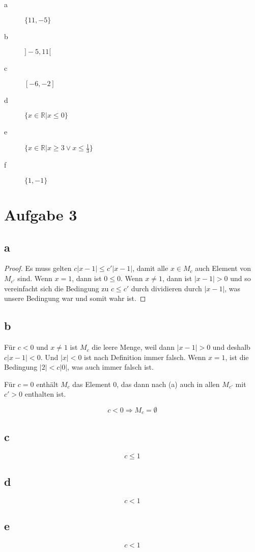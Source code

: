\documentclass[a4paper,10pt]{article}
\begin{document}
\begin{description}
 \item[a] $\{11, -5\}$
 \item[b] $]-5, 11[$
 \item[c] $[-6, -2]$
 \item[d] $\{ x \in \mathbb{R} | x \le 0\}$
 \item[e] $\{ x \in \mathbb{R} | x \ge 3 \lor x \le \frac{1}{3}\}$
 \item[f] $\{1, -1\}$
\end{description}

\section*{Aufgabe 3}

\subsection*{a}

\begin{proof}
 Es muss gelten $c|x - 1| \le c'|x - 1|$, damit alle $x \in M_c$ auch Element von $M_{c'}$ sind.
 Wenn $x = 1$, dann ist $0 \le 0$.
 Wenn $x \ne 1$, dann ist $|x - 1| > 0$ und so vereinfacht sich die Bedingung zu $c \le c'$ durch dividieren durch $|x - 1|$, was unsere Bedingung war und somit wahr ist.
\end{proof}

\subsection*{b}

Für $c < 0$ und $x \ne 1$ ist $M_c$ die leere Menge, weil dann $|x - 1| > 0$ und deshalb $c|x - 1| < 0$.
Und $|x| < 0$ ist nach Definition immer falsch.
Wenn $x = 1$, ist die Bedingung $|2| < c|0|$, was auch immer falsch ist.

Für $c = 0$ enthält $M_c$ das Element $0$, das dann nach (a) auch in allen $M_{c'}$ mit $c' > 0$ enthalten ist.

\begin{equation*}
 c < 0 \Rightarrow M_c = \emptyset
\end{equation*}

\subsection*{c}

\begin{equation}
 c \le 1
\end{equation}

\subsection*{d}

\begin{equation}
 c < 1
\end{equation}

\subsection*{e}

\begin{equation}
 c < 1
\end{equation}
\end{document}
